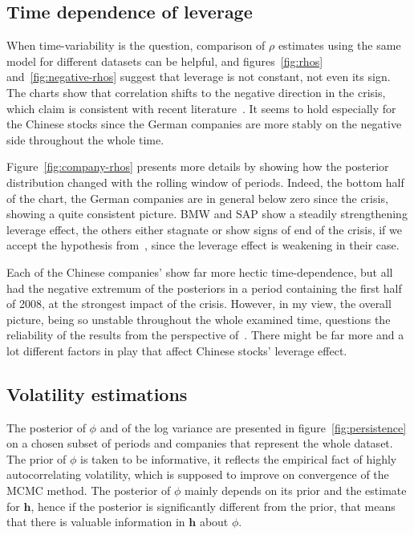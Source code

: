 \subsection{Time dependence of leverage}

When time-variability is the question, comparison of $\rho$ estimates using the same model for different datasets can be helpful, and figures~\ref{fig:rhos} and~\ref{fig:negative-rhos} suggest that leverage is not constant, not even its sign.
The charts show that correlation shifts to the negative direction in the crisis, which claim is consistent with recent literature~\citep{Christensen2015}.
It seems to hold especially for the Chinese stocks since the German companies are more stably on the negative side throughout the whole time.

Figure~\ref{fig:company-rhos} presents more details by showing how the posterior distribution changed with the rolling window of periods.
Indeed, the bottom half of the chart, the German companies are in general below zero since the crisis, showing a quite consistent picture.
BMW and SAP show a steadily strengthening leverage effect, the others either stagnate or show signs of end of the crisis, if we accept the hypothesis from~\citeauthor{Christensen2015}, since the leverage effect is weakening in their case.

Each of the Chinese companies' show far more hectic time-dependence, but all had the negative extremum of the posteriors in a period containing the first half of 2008, at the strongest impact of the crisis.
However, in my view, the overall picture, being so unstable throughout the whole examined time, questions the reliability of the results from the perspective of~\citeauthor{Christensen2015}.
There might be far more and a lot different factors in play that affect Chinese stocks' leverage effect.

\subsection{Volatility estimations}

The posterior of $\phi$ and of the log variance are presented in figure~\ref{fig:persistence} on a chosen subset of periods and companies that represent the whole dataset.
The prior of $\phi$ is taken to be informative, it reflects the empirical fact of highly autocorrelating volatility, which is supposed to improve on convergence of the MCMC method.
The posterior of $\phi$ mainly depends on its prior and the estimate for $\bm h$, hence if the posterior is significantly different from the prior, that means that there is valuable information in $\bm h$ about $\phi$.

